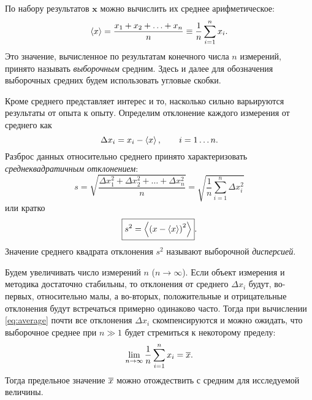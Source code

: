 По набору результатов $\mathbf{x}$ можно вычислить их среднее арифметическое:
\begin{equation}
 \left<x\right>=\frac{x_{1}+x_{2}+\ldots+x_{n}}{n}\equiv\frac{1}{n}\sum\limits
_{i=1}^{n}x_{i}\label{eq:average}.
\end{equation}
Это значение, вычисленное по результатам конечного числа $n$ измерений,
принято называть \emph{выборочным} средним. Здесь и далее для обозначения
выборочных средних будем использовать угловые скобки.


Кроме среднего представляет интерес и то, насколько сильно варьируются
результаты от опыта к опыту. Определим отклонение каждого измерения от среднего как
\[
\Delta x_{i}=x_{i}-\left<x\right>,\qquad i=1\ldots n.
\]
Разброс данных относительно среднего принято характеризовать
\emph{среднеквадратичным отклонением}:
\begin{equation}
s=\sqrt{\frac{\Delta x_{1}^{2}+\Delta x_{2}^{2}+\ldots+\Delta
x_{n}^{2}}{n}}=\sqrt{\frac{1}{n}\sum\limits _{i=1}^{n}\Delta
x_{i}^{2}}\label{eq:sigma}
\end{equation}
или кратко
\begin{equation}
\boxed{s^{2}=\left<\left(x-\left<x\right>\right)^{2}\right>}.\label{eq:sigma_s}
\end{equation}
Значение среднего квадрата отклонения $s^{2}$ называют
выборочной \emph{дисперсией}.

%

Будем увеличивать число измерений $n$ ($n\to \infty$). Если объект измерения и методика
достаточно стабильны, то отклонения от среднего $\Delta x_i$ будут, во-первых,
относительно малы, а во-вторых, положительные и отрицательные отклонения будут
встречаться примерно одинаково часто. Тогда при вычислении \eqref{eq:average}
почти все отклонения $\Delta x_i$ скомпенсируются и можно ожидать,
что выборочное среднее при $n\gg 1$ будет стремиться к некоторому пределу:
\[
\lim_{n\to\infty}\frac{1}{n}\sum_{i=1}^{n}x_{i}=\overline{x}.
\]
Тогда предельное значение $\overline{x}$ можно отождествить с  средним
для исследуемой величины.


